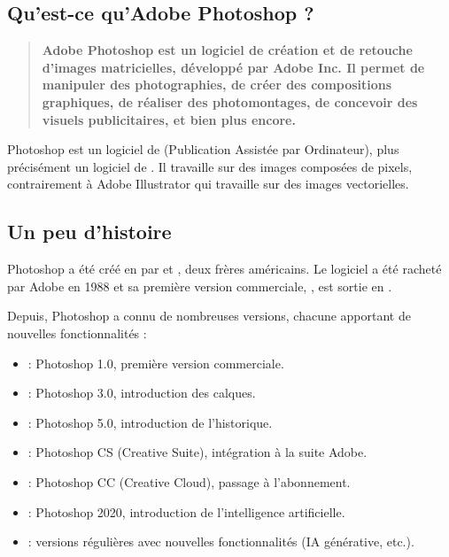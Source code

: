 \subsection{Qu'est-ce qu'Adobe Photoshop ?}

\begin{quote}
\textbf{Adobe Photoshop est un logiciel de création et de retouche d'images matricielles, développé par Adobe Inc. Il permet de manipuler des photographies, de créer des compositions graphiques, de réaliser des photomontages, de concevoir des visuels publicitaires, et bien plus encore.}
\end{quote}

Photoshop est un logiciel de  (Publication Assistée par Ordinateur), plus précisément un logiciel de . Il travaille sur des images composées de pixels, contrairement à Adobe Illustrator qui travaille sur des images vectorielles.

\subsection{Un peu d'histoire}

Photoshop a été créé en  par  et , deux frères américains. Le logiciel a été racheté par Adobe en 1988 et sa première version commerciale, , est sortie en .

Depuis, Photoshop a connu de nombreuses versions, chacune apportant de nouvelles fonctionnalités :

\begin{itemize}
    \item {} : Photoshop 1.0, première version commerciale.
    \item {} : Photoshop 3.0, introduction des calques.
    \item {} : Photoshop 5.0, introduction de l'historique.
    \item {} : Photoshop CS (Creative Suite), intégration à la suite Adobe.
    \item {} : Photoshop CC (Creative Cloud), passage à l'abonnement.
    \item {} : Photoshop 2020, introduction de l'intelligence artificielle.
    \item {} : versions régulières avec nouvelles fonctionnalités (IA générative, etc.).
\end{itemize}

